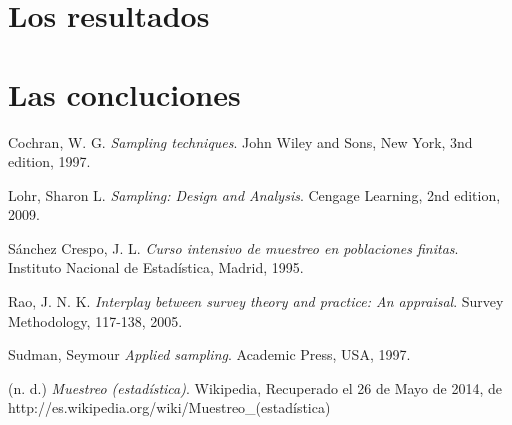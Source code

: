 \documentclass[a4paper]{article}
\begin{document}
\section{Los resultados}

\section{Las concluciones}

\begin{thebibliography}{6}

  Cochran, W. G.
  \emph{Sampling techniques}.
  John Wiley and Sons, New York,
  3nd edition,
  1997.

  Lohr, Sharon L.
  \emph{Sampling: Design and Analysis}.
  Cengage Learning,
  2nd edition,
  2009.
  
  Sánchez Crespo, J. L.
  \emph{Curso intensivo de muestreo en poblaciones finitas}.
  Instituto Nacional de Estadística, Madrid,
  1995.
  
  Rao, J. N. K.
  \emph{Interplay between survey theory and practice: An appraisal}.
  Survey Methodology, 
  117-138,
  2005.
  
  Sudman, Seymour
  \emph{Applied sampling}.
  Academic Press, USA,
  1997.
  
  (n. d.)
  \emph{Muestreo (estadística)}.
  Wikipedia, 
  Recuperado el 26 de Mayo de 2014, 
  de http://es.wikipedia.org/wiki/Muestreo\_(estadística)

\end{thebibliography}
\end{document}
